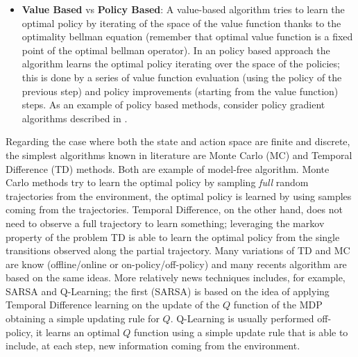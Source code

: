 \begin{itemize}
		\item \textbf{Value Based} vs \textbf{Policy Based}: A value-based algorithm tries to learn the optimal policy by iterating of the space of the value function
			thanks to the optimality bellman equation (remember that optimal value function is a fixed point of the optimal bellman operator). In an policy
			based approach the algorithm learns the optimal policy iterating over the space of the policies; this is done by a series of value function evaluation
			(using the policy of the previous step) and policy improvements (starting from the value function) steps. As an example of policy based methods, consider policy gradient algorithms
			described in \cite{sutton2000policy}.
	\end{itemize}

	\noindent Regarding the case where both the state and action space are finite and discrete, the simplest algorithms known in literature are Monte Carlo (MC) and Temporal Difference (TD) methods. Both are example of model-free algorithm.\newline
	Monte Carlo methods try to learn the optimal policy by sampling \textit{full} random trajectories from the environment, the optimal policy is learned by using samples
	coming from the trajectories. Temporal Difference, on the other hand, does not need to observe a full trajectory to learn something; leveraging the markov property of the problem
	TD is able to learn the optimal policy from the single transitions observed along the partial trajectory. Many variations of TD and MC are know (offline/online or on-policy/off-policy)
	and many recents algorithm are based on the same ideas.\newline
	More relatively news techniques includes, for example, SARSA and Q-Learning; the first (SARSA) is based on the idea of applying Temporal Difference learning on the update of the
	$Q$ function of the MDP obtaining a simple updating rule for $Q$. Q-Learning is usually performed off-policy, it learns an optimal $Q$ function using a simple update rule that is
	able to include, at each step, new information coming from the environment.\newline

